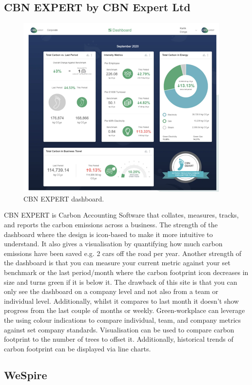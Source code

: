 \documentclass{l4proj}
\begin{document}
\subsection{CBN EXPERT by CBN Expert Ltd}

\begin{figure}[ht]
  \centering
  \includegraphics[width=0.75\linewidth]{images/CBN Expert.png}
  \caption{CBN EXPERT dashboard.}
  \label{fig:transportmodedetection}
\end{figure}
 
CBN EXPERT is Carbon Accounting Software that collates, measures, tracks, and reports the carbon emissions across a business. The strength of the dashboard where the design is icon-based to make it more intuitive to understand. It also gives a visualisation by quantifying how much carbon emissions have been saved e.g. 2 cars off the road per year. Another strength of the dashboard is that you can measure your current metric against your set benchmark or the last period/month where the carbon footprint icon decreases in size and turns green if it is below it. The drawback of this site is that you can only see the dashboard on a company level and not also from a team or individual level. Additionally, whilst it compares to last month it doesn’t show progress from the last couple of months or weekly. Green-workplace can leverage the using colour indications to compare individual, team, and company metrics against set company standards. Visualisation can be used to compare carbon footprint to the number of trees to offset it. Additionally, historical trends of carbon footprint can be displayed via line charts.


\subsection{WeSpire}
\end{document}
